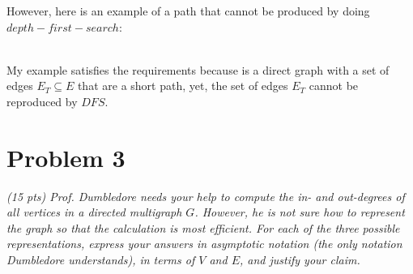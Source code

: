 \documentclass[12pt]{article} \setlength{\oddsidemargin}{0in}
\begin{document}
However, here is an example of a path that cannot be produced by doing $depth-first-search$:\\
 \\
My example satisfies the requirements because is a direct graph with a set of edges $E_T \subseteq E$ that are a short path, yet, the set of edges $E_T$ cannot be reproduced by $DFS$. 
\newpage

\section*{Problem 3}

\textit{(15 pts) Prof. Dumbledore needs your help to compute the in-
  and out-degrees of all vertices in a directed multigraph
  $G$. However, he is not sure how to represent the graph so that the
  calculation is most efficient. For each of the three possible
  representations, express your answers in asymptotic notation (the
  only notation Dumbledore understands), in terms of $V$ and $E$, and
  justify your claim.}
\end{document}
